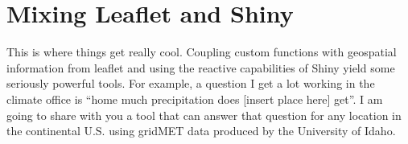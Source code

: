 \documentclass[]{article}
\newenvironment{Shaded}{\begin{snugshade}}{\end{snugshade}}
\newcommand{\CommentTok}[1]{\textcolor[rgb]{0.56,0.35,0.01}{\textit{#1}}}
\newcommand{\DataTypeTok}[1]{\textcolor[rgb]{0.13,0.29,0.53}{#1}}
\newcommand{\DecValTok}[1]{\textcolor[rgb]{0.00,0.00,0.81}{#1}}
\newcommand{\FloatTok}[1]{\textcolor[rgb]{0.00,0.00,0.81}{#1}}
\newcommand{\KeywordTok}[1]{\textcolor[rgb]{0.13,0.29,0.53}{\textbf{#1}}}
\newcommand{\NormalTok}[1]{#1}
\newcommand{\OperatorTok}[1]{\textcolor[rgb]{0.81,0.36,0.00}{\textbf{#1}}}
\newcommand{\StringTok}[1]{\textcolor[rgb]{0.31,0.60,0.02}{#1}}
\begin{document}
\begin{Shaded}
\end{Shaded}

\hypertarget{mixing-leaflet-and-shiny}{%
\section{Mixing Leaflet and Shiny}\label{mixing-leaflet-and-shiny}}

This is where things get really cool. Coupling custom functions with
geospatial information from leaflet and using the reactive capabilities
of Shiny yield some seriously powerful tools. For example, a question I
get a lot working in the climate office is ``home much precipitation
does {[}insert place here{]} get''. I am going to share with you a tool
that can answer that question for any location in the continental U.S.
using gridMET data produced by the University of Idaho.
\end{document}
